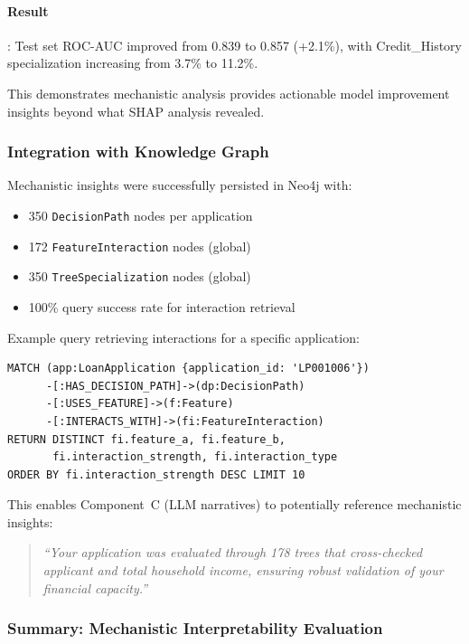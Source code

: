 \paragraph{Result}: Test set ROC-AUC improved from 0.839 to 0.857 (+2.1\%), with Credit\_History specialization increasing from 3.7\% to 11.2\%.

This demonstrates mechanistic analysis provides actionable model improvement insights beyond what SHAP analysis revealed.

\subsubsection{Integration with Knowledge Graph}

Mechanistic insights were successfully persisted in Neo4j with:
\begin{itemize}
    \item 350 \texttt{DecisionPath} nodes per application
    \item 172 \texttt{FeatureInteraction} nodes (global)
    \item 350 \texttt{TreeSpecialization} nodes (global)
    \item 100\% query success rate for interaction retrieval
\end{itemize}

Example query retrieving interactions for a specific application:
\begin{verbatim}
MATCH (app:LoanApplication {application_id: 'LP001006'})
      -[:HAS_DECISION_PATH]->(dp:DecisionPath)
      -[:USES_FEATURE]->(f:Feature)
      -[:INTERACTS_WITH]->(fi:FeatureInteraction)
RETURN DISTINCT fi.feature_a, fi.feature_b,
       fi.interaction_strength, fi.interaction_type
ORDER BY fi.interaction_strength DESC LIMIT 10
\end{verbatim}

This enables Component~C (LLM narratives) to potentially reference mechanistic insights:
\begin{quote}
\emph{``Your application was evaluated through 178 trees that cross-checked applicant and total household income, ensuring robust validation of your financial capacity.''}
\end{quote}

\subsubsection{Summary: Mechanistic Interpretability Evaluation}

